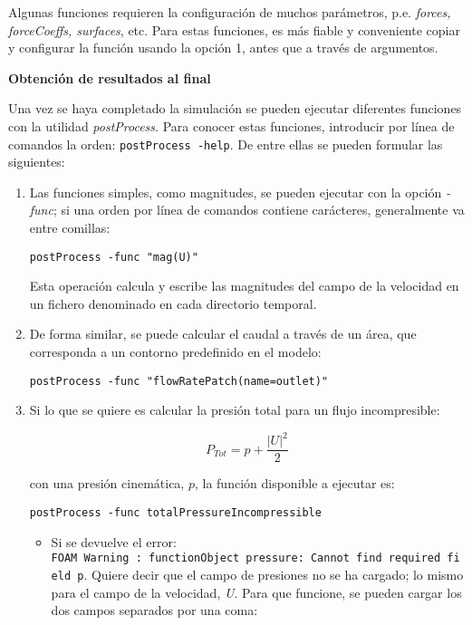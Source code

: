 Algunas funciones requieren la configuración de muchos parámetros, p.e.
\emph{forces, forceCoeffs, surfaces}, etc. Para estas funciones, es más
fiable y conveniente copiar y configurar la función usando la opción 1,
antes que a través de argumentos.

\textbf{Obtención de resultados al final}

Una vez se haya completado la simulación se pueden ejecutar diferentes
funciones con la utilidad \emph{postProcess}. Para conocer estas
funciones, introducir por línea de comandos la orden:
\texttt{postProcess\ -help}. De entre ellas se pueden formular las
siguientes:

\begin{enumerate}
\def\labelenumi{\arabic{enumi}.}
\item
  Las funciones simples, como magnitudes, se pueden ejecutar con la
  opción \emph{-func}; si una orden por línea de comandos contiene
  carácteres, generalmente va entre comillas:

  \begin{lstlisting}[style=bash]
    postProcess -func "mag(U)"
  \end{lstlisting}

  Esta operación calcula y escribe las magnitudes del campo de la
  velocidad en un fichero denominado en cada directorio temporal.
\item
  De forma similar, se puede calcular el caudal a través de un área, que
  corresponda a un contorno predefinido en el modelo:

  \begin{lstlisting}[style=bash]
    postProcess -func "flowRatePatch(name=outlet)"
  \end{lstlisting}

\item
  Si lo que se quiere es calcular la presión total para un flujo
  incompresible:

  \[P_{Tot}= p + \frac{|U|^2}{2}\]

  con una presión cinemática, \(p\), la función disponible a ejecutar
  es:

  \begin{lstlisting}[style=bash]
    postProcess -func totalPressureIncompressible
  \end{lstlisting}

  \begin{itemize}
  \item
    Si se devuelve el error:
    \texttt{FOAM\ Warning\ :\ functionObject\ pressure:\ Cannot\ find\ required\ field\ p}.
    Quiere decir que el campo de presiones no se ha cargado; lo mismo
    para el campo de la velocidad, \emph{U}. Para que funcione, se
    pueden cargar los dos campos separados por una coma:


\end{itemize}
\end{enumerate}
